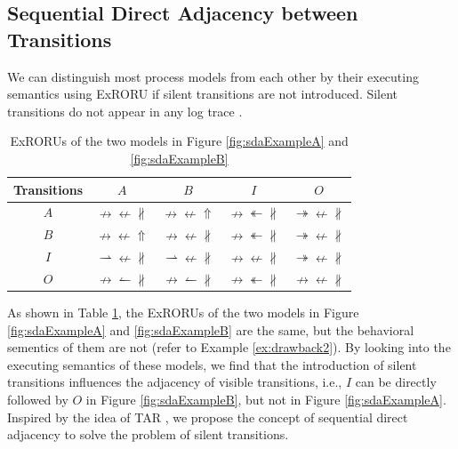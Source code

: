 \documentclass[dvips,...]{llncs}
\makeatletter
\newcommand\tabcaption{\def\@captype{table}\caption}
\makeatother
\begin{document}
\subsection{Sequential Direct Adjacency between Transitions}\label{subsec:sda}
We can distinguish most process models from each other by their executing semantics using ExRORU if silent transitions are not introduced. Silent transitions do not appear in any log trace \cite{de2003workflow}.

\begin{table}[htbp]
\centering
\tabcaption{ExRORUs of the two models in Figure \ref{fig:sdaExampleA} and \ref{fig:sdaExampleB}\label{tab:sdaExample}}
\begin{tabular}{c|c|c|c|c} \hline
	Transitions & $A$ & $B$ & $I$ & $O$\\ \hline
	$A$
		& $\nrightarrow\nleftarrow\nparallel$
		& $\nrightarrow\nleftarrow\Uparrow$
		& $\nrightarrow\twoheadleftarrow\nparallel$
		& $\twoheadrightarrow\nleftarrow\nparallel$
		\\ \hline
	$B$
		& $\nrightarrow\nleftarrow\Uparrow$
		& $\nrightarrow\nleftarrow\nparallel$
		& $\nrightarrow\twoheadleftarrow\nparallel$
		& $\twoheadrightarrow\nleftarrow\nparallel$
		\\ \hline
	$I$
		& $\rightharpoonup\nleftarrow\nparallel$
		& $\rightharpoonup\nleftarrow\nparallel$
		& $\nrightarrow\nleftarrow\nparallel$
		& $\twoheadrightarrow\nleftarrow\nparallel$
		\\ \hline
	$O$
		& $\nrightarrow\leftharpoonup\nparallel$
		& $\nrightarrow\leftharpoonup\nparallel$
		& $\nrightarrow\twoheadleftarrow\nparallel$
		& $\nrightarrow\nleftarrow\nparallel$
		\\ \hline
\end{tabular}
\end{table}

As shown in Table \ref{tab:sdaExample}, the ExRORUs of the two models in Figure \ref{fig:sdaExampleA} and \ref{fig:sdaExampleB} are the same, but the behavioral sementics of them are not (refer to Example \ref{ex:drawback2}). By looking into the executing semantics of these models, we find that the introduction of silent transitions influences the adjacency of visible transitions, i.e., $I$ can be directly followed by $O$ in Figure \ref{fig:sdaExampleB}, but not in Figure \ref{fig:sdaExampleA}. Inspired by the idea of TAR \cite{zha2010workflow}, we propose the concept of sequential direct adjacency to solve the problem of silent transitions.
\end{document}
